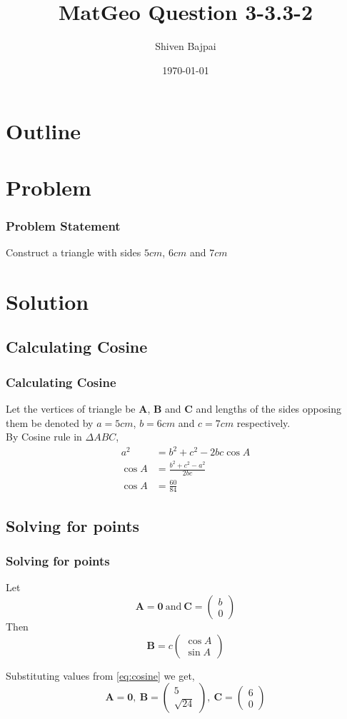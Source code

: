 \documentclass{beamer}
\title[MatGeo 3-3.3-2]{MatGeo Question 3-3.3-2}
\author[Shiven Bajpai]{Shiven Bajpai}
\institute[AI24BTECH11030]{AI24BTECH11030\\IIT Hyderabad}
\date{\today}
\theoremstyle{remark}
\newcommand{\myvec}[1]{\ensuremath{\begin{pmatrix}#1\end{pmatrix}}}
\let\vec\mathbf
\numberwithin{equation}{section}
\begin{document}
\begin{frame}
\titlepage
\end{frame}

\section*{Outline}
\begin{frame}
\tableofcontents
\end{frame}

\section{Problem}
\begin{frame}
\frametitle{Problem Statement}
Construct a triangle with sides $5cm$, $6cm$ and $7cm$
\end{frame}

\section{Solution}
\subsection{Calculating Cosine}
\begin{frame}
\frametitle{Calculating Cosine}

Let the vertices of triangle be $\vec{A}$, $\vec{B}$ and $\vec{C}$ and lengths of the sides opposing them be denoted by $a = 5cm$, $b = 6cm$ and $c = 7cm$ respectively.
\\

By Cosine rule in $\Delta ABC$,
\begin{align}
	a^2 &= b^2 + c^2 - 2bc \cos A\\
	\cos A &= \frac{b^2 + c^2 - a^2}{2bc}\\
	\label{eq:cosine} \cos A &= \frac{60}{84} 
\end{align}

\end{frame}

\subsection{Solving for points}
\begin{frame}[fragile]
\frametitle{Solving for points}

Let 
$$\vec{A} = \vec{0} \ \text{and} \ \vec{C} = \myvec{b \\ 0}$$
Then 
$$\vec{B} = c\myvec{\cos A \\ \sin A}$$

Substituting values from \ref{eq:cosine} we get, 
$$\vec{A} = \vec{0}, \ \vec{B} = \myvec{5 \\ \sqrt{24}}, \ \vec{C} = \myvec{6 \\ 0}$$
\end{frame}
\end{document}
